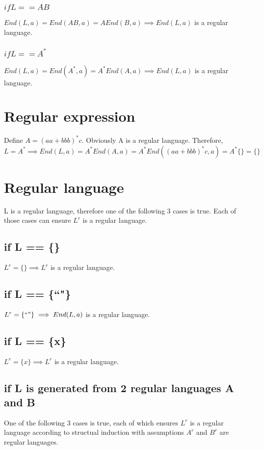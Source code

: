 \documentclass{article}
\begin{document}
\subsubsection{$if L == A B$}
$End(L, a) = End(A B, a) = A End(B, a) \implies End(L, a)$ is a regular
language.

\subsubsection{$if L == A^*$}
$End(L, a) = End(A^*, a) = A^* End(A, a) \implies End(L, a)$ is a regular
language.

\section{Regular expression}
Define $A = (aa + bbb)^* c$. Obviously A is a regular language. Therefore,
\[L = A^* \implies End(L, a)
= A^* End(A, a)
= A^* End((aa + bbb)^* c, a)
= A^*\{\} = \{\}
\]

\section{Regular language}
L is a regular language, therefore one of the following 3 cases is true. Each of
those cases can ensure $L^r$ is a regular language.

\subsection{if L == \{\}}
$L^r = \{\} \implies L^r$ is a regular language.

\subsection{if L == \{``"\}}
$L^r = \{``"\} \implies End(L, a)$ is a regular language.

\subsection{if L == \{x\}}
$L^r = \{x\} \implies L^r$ is a regular language.

\subsection{if L is generated from 2 regular languages A and B}
One of the following 3 cases is true, each of which ensures $L^r$ is a
regular language according to structual induction with assumptions $A^r$ and
$B^r$ are regular languages.
\end{document}
